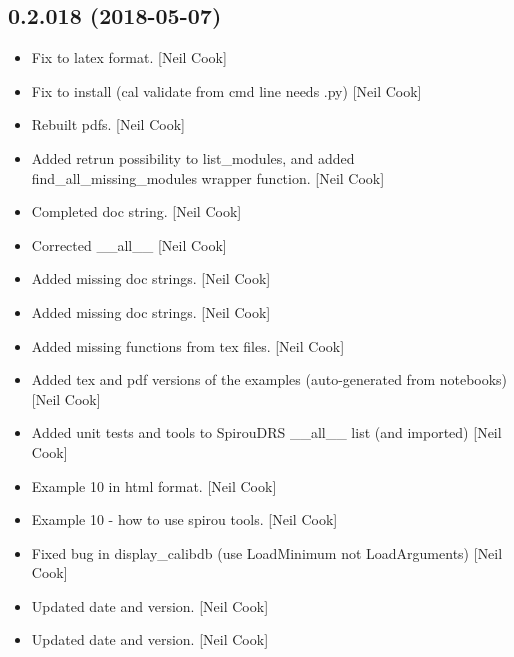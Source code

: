 \documentclass[a4paper,10pt,english]{report}
\begin{document}
\subsection{0.2.018 (2018-05-07)}
\label{\detokenize{misc/changelog:id441}}\begin{itemize}
\item {} 
Fix to latex format. {[}Neil Cook{]}

\item {} 
Fix to install (cal validate from cmd line needs .py) {[}Neil Cook{]}

\item {} 
Rebuilt pdfs. {[}Neil Cook{]}

\item {} 
Added retrun possibility to list\_modules, and added
find\_all\_missing\_modules wrapper function. {[}Neil Cook{]}

\item {} 
Completed doc string. {[}Neil Cook{]}

\item {} 
Corrected \_\_all\_\_ {[}Neil Cook{]}

\item {} 
Added missing doc strings. {[}Neil Cook{]}

\item {} 
Added missing doc strings. {[}Neil Cook{]}

\item {} 
Added missing functions from tex files. {[}Neil Cook{]}

\item {} 
Added tex and pdf versions of the examples (auto-generated from
notebooks) {[}Neil Cook{]}

\item {} 
Added unit tests and tools to SpirouDRS \_\_all\_\_ list (and imported)
{[}Neil Cook{]}

\item {} 
Example 10 in html format. {[}Neil Cook{]}

\item {} 
Example 10 - how to use spirou tools. {[}Neil Cook{]}

\item {} 
Fixed bug in display\_calibdb (use LoadMinimum not LoadArguments) {[}Neil
Cook{]}

\item {} 
Updated date and version. {[}Neil Cook{]}

\item {} 
Updated date and version. {[}Neil Cook{]}


\end{itemize}
\end{document}
